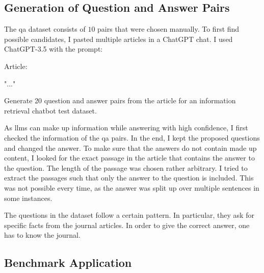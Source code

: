 \documentclass[../main.tex]{subfiles}
\begin{document}
\subsection{Generation of Question and Answer Pairs}

The \gls{qa} dataset consists of $10$ pairs that were chosen manually.
To first find possible candidates, I pasted multiple articles in
a ChatGPT chat.
I used ChatGPT-3.5 with the prompt:
\begin{Code}
    Article:

    "..."

    Generate 20 question and answer pairs from the article
    for an information retrieval chatbot test dataset.
\end{Code}
As \glspl{llm} can make up information while answering with high confidence,
I first checked the information of the \gls{qa} pairs.
In the end, I kept the proposed questions and changed the answer.
To make sure that the answers do not contain made up content, I looked for
the exact passage in the article that contains the answer to the question.
The length of the passage was chosen rather arbitrary.
I tried to extract the passages such that only the answer to the question
is included.
This was not possible every time, as the answer was split up over multiple
sentences in some instances.

The questions in the dataset follow a certain pattern.
In particular, they ask for specific facts from the journal articles.
In order to give the correct answer, one has to know the journal.


\subsection{Benchmark Application}
\end{document}
